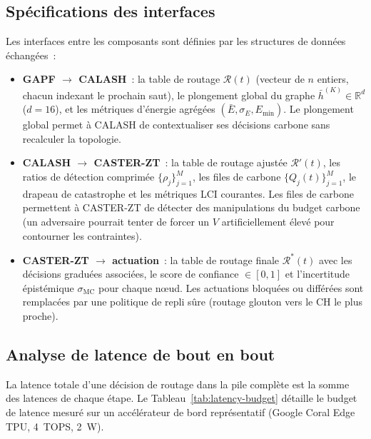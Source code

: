 \subsection{Spécifications des interfaces}

Les interfaces entre les composants sont définies par les structures de données échangées~:

\begin{itemize}
    \item \textbf{GAPF $\to$ CALASH}~: la table de routage $\mathcal{R}(t)$ (vecteur de $n$ entiers, chacun indexant le prochain saut), le plongement global du graphe $\bar{h}^{(K)} \in \mathbb{R}^d$ ($d = 16$), et les métriques d'énergie agrégées $(\bar{E}, \sigma_E, E_{\min})$. Le plongement global permet à CALASH de contextualiser ses décisions carbone sans recalculer la topologie.
    \item \textbf{CALASH $\to$ CASTER-ZT}~: la table de routage ajustée $\mathcal{R}'(t)$, les ratios de détection comprimée $\{\rho_j\}_{j=1}^{M}$, les files de carbone $\{Q_j(t)\}_{j=1}^{M}$, le drapeau de catastrophe et les métriques LCI courantes. Les files de carbone permettent à CASTER-ZT de détecter des manipulations du budget carbone (un adversaire pourrait tenter de forcer un $V$ artificiellement élevé pour contourner les contraintes).
    \item \textbf{CASTER-ZT $\to$ actuation}~: la table de routage finale $\mathcal{R}^*(t)$ avec les décisions graduées associées, le score de confiance $\in [0, 1]$ et l'incertitude épistémique $\sigma_{\text{MC}}$ pour chaque n\oe{}ud. Les actuations bloquées ou différées sont remplacées par une politique de repli sûre (routage glouton vers le CH le plus proche).
\end{itemize}

\subsection{Analyse de latence de bout en bout}

La latence totale d'une décision de routage dans la pile complète est la somme des latences de chaque étape. Le Tableau~\ref{tab:latency-budget} détaille le budget de latence mesuré sur un accélérateur de bord représentatif (Google Coral Edge TPU, 4~TOPS, 2~W).

